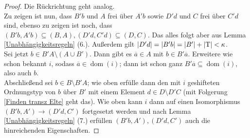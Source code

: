 \begin{proof}
	Die Rückrichtung geht analog.\\
	Zu zeigen ist nun, dass $B'b$ und $A$ frei über $A'b$ sowie $D'd$ und $C$ frei über $C'd$ sind, ebenso zu zeigen ist noch, dass $(B'b,A'b)\subseteq(B,A),(D'd,C'd)\subseteq(D,C)$. Das alles folgt aber aus Lemma \ref{Unabhängigkeitsregeln} (6.). Außerdem gilt ${\left| D'd \right|}={\left| B'b \right|}={\left| B' \right|}+{\left| \operatorname{T} \right|}<\kappa$.\\
	Sei jetzt $b\in B'A\setminus(A\cup B')$. Dann gibt es $\overline{a}\in A$ mit $b\in B'\overline{a}$. Erweitere wie schon bekannt $i$, sodass $\overline{a}\in\operatorname{dom}(i)$; dann ist schon ganz $B'\overline{a}\subseteq\operatorname{dom}(i)$, also auch $b$.\\
	Abschließend sei $b\in B\setminus B'A$;  wie oben erfülle dann den mit $i$ geshifteten Ordnungstyp von $b$ über $B'$ mit einem Element $d\in D\setminus D'C$ (mit Folgerung \ref{Finden transz Elte} geht das). Wie oben kann $i$ dann auf einen Isomorphismus $(B'b,A')\rightarrow(D'd,C')$ fortgesetzt werden und nach Lemma \ref{Unabhängigkeitsregeln} (7.) erfüllen $(B'b,A'),(D'd,C')$ auch die hinreichenden Eigenschaften.
\end{proof}

